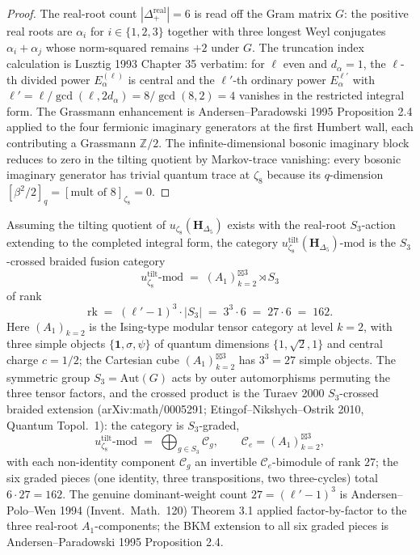 \begin{proof}
The real-root count $|\Delta^{\mathrm{real}}_+| = 6$ is read off the Gram matrix $G$: the positive real roots are $\alpha_i$ for $i\in\{1,2,3\}$ together with three longest Weyl conjugates $\alpha_i + \alpha_j$ whose norm-squared remains $+2$ under $G$. The truncation index calculation is Lusztig 1993 Chapter 35 verbatim: for $\ell$ even and $d_\alpha = 1$, the $\ell$-th divided power $E_\alpha^{(\ell)}$ is central and the $\ell'$-th ordinary power $E_\alpha^{\ell'}$ with $\ell' = \ell/\gcd(\ell,2d_\alpha) = 8/\gcd(8,2) = 4$ vanishes in the restricted integral form. The Grassmann enhancement is Andersen--Paradowski 1995 Proposition 2.4 applied to the four fermionic imaginary generators at the first Humbert wall, each contributing a Grassmann $\mathbb{Z}/2$. The infinite-dimensional bosonic imaginary block reduces to zero in the tilting quotient by Markov-trace vanishing: every bosonic imaginary generator has trivial quantum trace at $\zeta_8$ because its $q$-dimension $[\beta^2/2]_q = [\text{mult of }8]_{\zeta_8} = 0$.
\end{proof}

\begin{theorem}
\label{thm:s3-crossed-tilting-quotient}
Assuming the tilting quotient of
$u_{\zeta_8}(\mathbf{H}_{\Delta_5})$ exists with the real-root
$S_3$-action extending to the completed integral form, the category
$u_{\zeta_8}^{\mathrm{tilt}}(\mathbf{H}_{\Delta_5})$-$\mathrm{mod}$ is the
$S_3$-crossed braided fusion category
\[
 u_{\zeta_8}^{\mathrm{tilt}}\text{-}\mathrm{mod}
 \;=\;
 (A_1)_{k=2}^{\boxtimes 3}\rtimes S_3
\]
of rank
\[
 \mathrm{rk}
 \;=\;
 (\ell'-1)^{3}\cdot |S_3|
 \;=\;
 3^{3}\cdot 6
 \;=\;
 27\cdot 6
 \;=\;
 162.
\]
Here $(A_1)_{k=2}$ is the Ising-type modular tensor category at level $k = 2$, with three simple objects $\{\mathbf{1},\sigma,\psi\}$ of quantum dimensions $\{1,\sqrt{2},1\}$ and central charge $c = 1/2$; the Cartesian cube $(A_1)_{k=2}^{\boxtimes 3}$ has $3^{3} = 27$ simple objects. The symmetric group $S_3 = \mathrm{Aut}(G)$ acts by outer automorphisms permuting the three tensor factors, and the crossed product is the Turaev 2000 $S_3$-crossed braided extension (arXiv:math/0005291; Etingof--Nikshych--Ostrik 2010, Quantum Topol.\ 1): the category is $S_3$-graded,
\[
 u_{\zeta_8}^{\mathrm{tilt}}\text{-}\mathrm{mod}
 \;=\;
 \bigoplus_{g\in S_3}\mathcal{C}_g,
 \qquad
 \mathcal{C}_e = (A_1)_{k=2}^{\boxtimes 3},
\]
with each non-identity component $\mathcal{C}_g$ an invertible $\mathcal{C}_e$-bimodule of rank $27$; the six graded pieces (one identity, three transpositions, two three-cycles) total $6\cdot 27 = 162$. The genuine dominant-weight count $27 = (\ell'-1)^3$ is Andersen--Polo--Wen 1994 (Invent.\ Math.\ 120) Theorem 3.1 applied factor-by-factor to the three real-root $A_1$-components; the BKM extension to all six graded pieces is Andersen--Paradowski 1995 Proposition 2.4.
\end{theorem}

